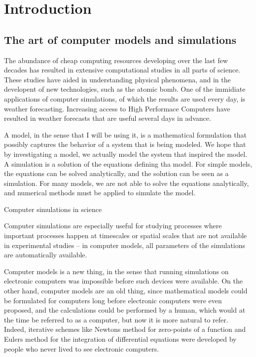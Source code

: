 \chapter{Introduction}
\section{The art of computer models and simulations}
The abundance of cheap computing resources developing over the last few decades has resulted in extensive computational studies in all parts of science. These studies have aided in understanding physical phenomena, and in the developent of new technologies, such as the atomic bomb. One of the immidiate applications of computer simulations, of which the results are used every day, is weather forecasting. Increasing access to High Performace Computers have resulted in weather forecasts that are useful several days in advance. 

A model, in the sense that I will be using it, is a mathematical formulation that possibly captures the behavior of a system that is being modeled. We hope that by investigating a model, we actually model the system that inspired the model. A simulation is a solution of the equations defining tha model. For simple models, the equations can be solved analytically, and the solution can be seen as a simulation. For many models, we are not able to solve the equations analytically, and numerical methods must be applied to simulate the model. 

Computer simulations in science

Computer simulations are especially useful for studying processes where important processes happen at timescales or spatial scales that are not available in experimental studies -- in computer models, all parameters of the simulations are automatically available.

Computer models is a new thing, in the sense that running simulations on electronic computers was impossible before such devices were available. On the other hand, computer models are an old thing, since mathematical models could be formulated for computers long before electronic computers were even proposed, and the calculations could be performed by a human, which would at the time be referred to as a computer, but now it is more natural to refer. Indeed, iterative schemes like Newtons method for zero-points of a function and Eulers method for the integration of differential equations were developed by people who never lived to see electronic computers. 

